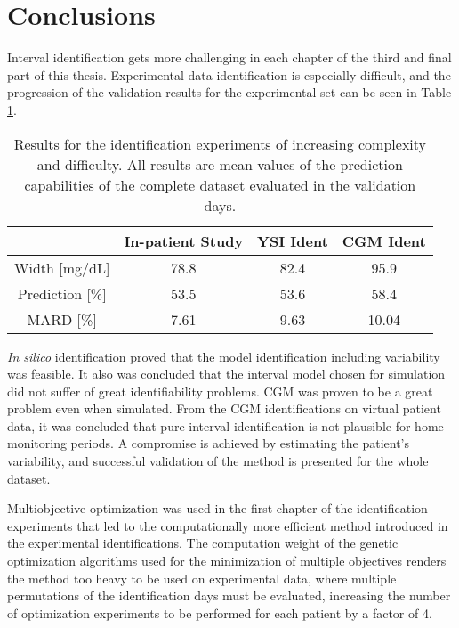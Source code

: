 \chapter*{Conclusions}
\label{sec:Conclusions_part3}

Interval identification gets more challenging in each chapter of the third and final part of this thesis. Experimental data identification is especially difficult, and the progression of the validation results for the experimental set can be seen in Table \ref{tab:resultspart3}.

\begin{table}[hbtp]
	\centering
	\begin{tabular}{ c | c | c | c } 
	 & In-patient Study & YSI Ident & CGM Ident\\
	\hline	
	Width [mg/dL] & 78.8 & 82.4 & 95.9 \\
	Prediction [\%] & 53.5 & 53.6 & 58.4 \\
	MARD [\%] & 7.61 & 9.63 & 10.04 \\
\end{tabular}
\caption{Results for the identification experiments of increasing complexity and difficulty. All results are mean values of the prediction capabilities of the complete dataset evaluated in the validation days.}
\label{tab:resultspart3}
\end{table}

\textit{In silico} identification proved that the model identification including variability was feasible. It also was concluded that the interval model chosen for simulation did not suffer of great identifiability problems. CGM was proven to be a great problem even when simulated. From the CGM identifications on virtual patient data, it was concluded that pure interval identification is not plausible for home monitoring periods. A compromise is achieved by estimating the patient's variability, and successful validation of the method is presented for the whole dataset.

Multiobjective optimization was used in the first chapter of the identification experiments that led to the computationally more efficient method introduced in the experimental identifications. The computation weight of the genetic optimization algorithms used for the minimization of multiple objectives renders the method too heavy to be used on experimental data, where multiple permutations of the identification days must be evaluated, increasing the number of optimization experiments to be performed for each patient by a factor of 4.

